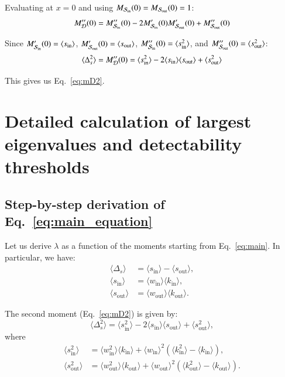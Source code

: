 \documentclass[a4paper,pre,superscriptaddress,floatfix,nofootinbib,twocolumn]{revtex4-1}
\begin{document}
Evaluating at $x = 0$ and using $M_{{\cal S}_\text{in}}(0) = M_{{\cal S}_\text{out}}(0) = 1$:
\[
M''_{\cal D}(0) = M''_{{\cal S}_\text{in}}(0) - 2 M'_{{\cal S}_\text{in}}(0) M'_{{\cal S}_\text{out}}(0) + M''_{{\cal S}_\text{out}}(0)
\]

Since $M'_{{\cal S}_\text{in}}(0) = \langle s_\text{in} \rangle$, $M'_{{\cal S}_\text{out}}(0) = \langle s_\text{out} \rangle$, $M''_{{\cal S}_\text{in}}(0) = \langle s^2_\text{in} \rangle$, and $M''_{{\cal S}_\text{out}}(0) = \langle s^2_\text{out} \rangle$:
\[
\langle \Delta_s^2 \rangle = M''_{\cal D}(0) = \langle s^2_\text{in} \rangle - 2 \langle s_\text{in} \rangle \langle s_\text{out} \rangle + \langle s^2_\text{out} \rangle
\]

This gives us Eq.~\eqref{eq:mD2}.




\section{Detailed calculation of largest eigenvalues and detectability thresholds}
\label{sec:threshold_calculations}

\subsection*{Step-by-step derivation of Eq.~\eqref{eq:main_equation}}
\label{sec:derivation_of_main_equation}

Let us derive $\lambda$ as a function of the moments starting from Eq.~\eqref{eq:main}.
In particular, we have:
\begin{align*}
\langle \Delta_{s} \rangle &= \langle s_\text{in} \rangle - \langle s_\text{out} \rangle, \\
\langle s_\text{in} \rangle &= \langle w_\text{in} \rangle \langle k_{\text{in}} \rangle, \\
\langle s_\text{out} \rangle &= \langle w_\text{out} \rangle \langle k_{\text{out}} \rangle.
\end{align*}

The second moment (Eq.~\eqref{eq:mD2}) is given by:
\begin{equation*}
\langle \Delta_{s}^2 \rangle = \langle s^2_\text{in} \rangle - 2 \langle s_\text{in} \rangle \langle s_\text{out} \rangle + \langle s^2_\text{out} \rangle,
\end{equation*}
where
\begin{align*}
\langle s^2_\text{in} \rangle &= \langle w^2_\text{in} \rangle \langle k_{\text{in}} \rangle + \langle w_\text{in} \rangle^2 (\langle k_{\text{in}}^2 \rangle - \langle k_{\text{in}} \rangle), \\
\langle s^2_\text{out} \rangle &= \langle w^2_\text{out} \rangle \langle k_{\text{out}} \rangle + \langle w_\text{out} \rangle^2 (\langle k_{\text{out}}^2 \rangle - \langle k_{\text{out}} \rangle).
\end{align*}
\end{document}

